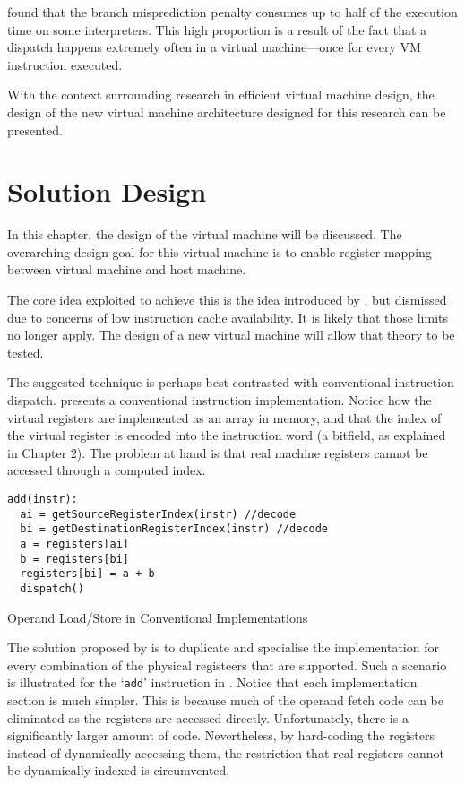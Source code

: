 		\cite{structureinterpreters} found that the branch misprediction penalty consumes up to half of the execution time on some interpreters. This high proportion is a result of the fact that a dispatch happens extremely often in a virtual machine---once for every VM instruction executed.
		
		With the context surrounding research in efficient virtual machine design, the design of the new virtual machine architecture designed for this research can be presented.
		
\chapter{Solution Design}
	In this chapter, the design of the virtual machine will be discussed. The overarching design goal for this virtual machine is to enable register mapping between virtual machine and host machine.
	
	The core idea exploited to achieve this is the idea introduced by \cite{stackcaching}, but dismissed due to concerns of low instruction cache availability. It is likely that those limits no longer apply. The design of a new virtual machine will allow that theory to be tested.
	
	The suggested technique is perhaps best contrasted with conventional instruction dispatch.  presents a conventional instruction implementation. Notice how the virtual registers are implemented as an array in memory, and that the index of the virtual register is encoded into the instruction word (a bitfield, as explained in Chapter 2). The problem at hand is that real machine registers cannot be accessed through a computed index.
	
	\begin{myfigure}
		\begin{lstlisting}
add(instr):
  ai = getSourceRegisterIndex(instr) //decode
  bi = getDestinationRegisterIndex(instr) //decode
  a = registers[ai]
  b = registers[bi]
  registers[bi] = a + b
  dispatch()
		\end{lstlisting}
		\caption{Operand Load/Store in Conventional Implementations}
		\label{fig:operandfetch}
	\end{myfigure}
	
	The solution proposed by \cite{stackcaching} is to duplicate and specialise the implementation for every combination of the physical registeers that are supported. Such a scenario is illustrated for the `\texttt{add}' instruction in . Notice that each implementation section is much simpler. This is because much of the operand fetch code can be eliminated as the registers are accessed directly. Unfortunately, there is a significantly larger amount of code. Nevertheless, by hard-coding the registers instead of dynamically accessing them, the restriction that real registers cannot be dynamically indexed is circumvented.
	
